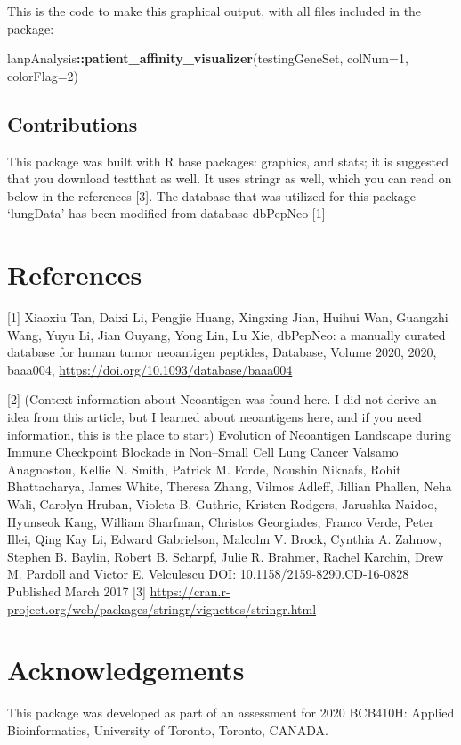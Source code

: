 \documentclass[
]{article}
\newenvironment{Shaded}{\begin{snugshade}}{\end{snugshade}}
\newcommand{\DataTypeTok}[1]{\textcolor[rgb]{0.13,0.29,0.53}{#1}}
\newcommand{\DecValTok}[1]{\textcolor[rgb]{0.00,0.00,0.81}{#1}}
\newcommand{\KeywordTok}[1]{\textcolor[rgb]{0.13,0.29,0.53}{\textbf{#1}}}
\newcommand{\NormalTok}[1]{#1}
\newcommand{\OperatorTok}[1]{\textcolor[rgb]{0.81,0.36,0.00}{\textbf{#1}}}
\begin{document}
This is the code to make this graphical output, with all files included
in the package:

\begin{Shaded}
\begin{Highlighting}[]
\NormalTok{lanpAnalysis}\OperatorTok{::}\KeywordTok{patient_affinity_visualizer}\NormalTok{(testingGeneSet, }\DataTypeTok{colNum=}\DecValTok{1}\NormalTok{, }\DataTypeTok{colorFlag=}\DecValTok{2}\NormalTok{)}
\end{Highlighting}
\end{Shaded}

\hypertarget{contributions}{%
\subsection{Contributions}\label{contributions}}

This package was built with R base packages: graphics, and stats; it is
suggested that you download testthat as well. It uses stringr as well,
which you can read on below in the references {[}3{]}. The database that
was utilized for this package `lungData' has been modified from database
dbPepNeo {[}1{]}

\hypertarget{references}{%
\section{References}\label{references}}

{[}1{]} Xiaoxiu Tan, Daixi Li, Pengjie Huang, Xingxing Jian, Huihui Wan,
Guangzhi Wang, Yuyu Li, Jian Ouyang, Yong Lin, Lu Xie, dbPepNeo: a
manually curated database for human tumor neoantigen peptides, Database,
Volume 2020, 2020, baaa004,
\url{https://doi.org/10.1093/database/baaa004}

{[}2{]} (Context information about Neoantigen was found here. I did not
derive an idea from this article, but I learned about neoantigens here,
and if you need information, this is the place to start) Evolution of
Neoantigen Landscape during Immune Checkpoint Blockade in Non--Small
Cell Lung Cancer Valsamo Anagnostou, Kellie N. Smith, Patrick M. Forde,
Noushin Niknafs, Rohit Bhattacharya, James White, Theresa Zhang, Vilmos
Adleff, Jillian Phallen, Neha Wali, Carolyn Hruban, Violeta B. Guthrie,
Kristen Rodgers, Jarushka Naidoo, Hyunseok Kang, William Sharfman,
Christos Georgiades, Franco Verde, Peter Illei, Qing Kay Li, Edward
Gabrielson, Malcolm V. Brock, Cynthia A. Zahnow, Stephen B. Baylin,
Robert B. Scharpf, Julie R. Brahmer, Rachel Karchin, Drew M. Pardoll and
Victor E. Velculescu DOI: 10.1158/2159-8290.CD-16-0828 Published March
2017 {[}3{]}
\url{https://cran.r-project.org/web/packages/stringr/vignettes/stringr.html}

\hypertarget{acknowledgements}{%
\section{Acknowledgements}\label{acknowledgements}}

This package was developed as part of an assessment for 2020 BCB410H:
Applied Bioinformatics, University of Toronto, Toronto, CANADA.
\end{document}
